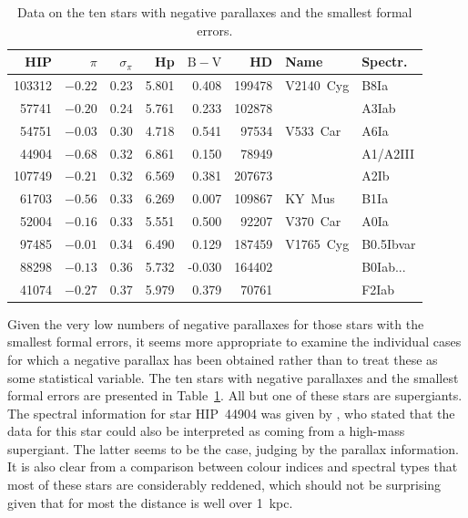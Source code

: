 \documentclass{aa}
\begin{document}
\begin{table}
\caption[]{Data on the ten stars with negative parallaxes and the smallest
formal errors.}
\scriptsize{
\begin{tabular}{rrrrrrll}\hline
HIP & $\pi$ & $\sigma_{\pi}$ & Hp & $\mathrm{B-V}$ & HD & Name & Spectr.\\
\hline
103312 & $-0.22$ & 0.23 & 5.801 &  0.408 & 199478 & V2140~Cyg  & B8Ia  \\       
 57741 & $-0.20$ & 0.24 & 5.761 &  0.233 & 102878 &            & A3Iab \\      
 54751 & $-0.03$ & 0.30 & 4.718 &  0.541 &  97534 & V533~Car   & A6Ia  \\      
 44904 & $-0.68$ & 0.32 & 6.861 &  0.150 &  78949 &            & A1/A2III \\   
107749 & $-0.21$ & 0.32 & 6.569 &  0.381 & 207673 &            & A2Ib    \\    
 61703 & $-0.56$ & 0.33 & 6.269 &  0.007 & 109867 & KY~Mus     & B1Ia    \\    
 52004 & $-0.16$ & 0.33 & 5.551 &  0.500 &  92207 & V370~Car   & A0Ia    \\    
 97485 & $-0.01$ & 0.34 & 6.490 &  0.129 & 187459 & V1765~Cyg  & B0.5Ibvar \\  
 88298 & $-0.13$ & 0.36 & 5.732 & -0.030 & 164402 &            & B0Iab...  \\  
 41074 & $-0.27$ & 0.37 & 5.979 &  0.379 &  70761 &            & F2Iab     \\  
\hline
\end{tabular}
}
\label{tab:negatpar}
\end{table}
Given the very low numbers of negative parallaxes for those stars with the
smallest formal errors, it seems more appropriate to examine the individual
cases for which a negative parallax has been obtained rather than to treat 
these as some statistical variable. The ten stars with negative parallaxes and
the smallest formal errors are presented in Table~\ref{tab:negatpar}.
All but one of these stars are supergiants. The spectral information for
star HIP~44904 was given by \citet{eggen86}, who stated that the data 
for this star could also be interpreted as coming from a high-mass 
supergiant. The latter seems to be the case, judging by the parallax 
information. It is also clear from a comparison between colour indices and
spectral types that most of these stars are considerably reddened, which
should not be surprising given that for most the distance is well over 1~kpc.
\end{document}

